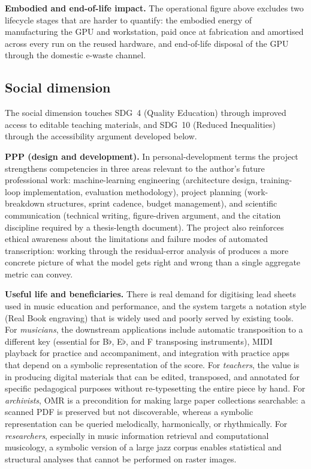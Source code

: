 \textbf{Embodied and end-of-life impact.}
The operational figure above excludes two lifecycle stages that are
harder to quantify: the embodied energy of manufacturing the GPU and
workstation, paid once at fabrication and amortised across every run
on the reused hardware, and end-of-life disposal of the GPU through
the domestic e-waste channel.

\subsection{Social dimension}
\label{sec:sust-social}
The social dimension touches SDG~4 (Quality Education) through
improved access to editable teaching materials, and SDG~10
(Reduced Inequalities) through the accessibility argument developed
below.

\textbf{PPP (design and development).}
In personal-development terms the project strengthens competencies
in three areas relevant to the author's future professional work:
machine-learning engineering (architecture design, training-loop
implementation, evaluation methodology), project planning
(work-breakdown structures, sprint cadence, budget management), and
scientific communication (technical writing, figure-driven argument,
and the citation discipline required by a thesis-length document).
The project also reinforces ethical awareness about the limitations
and failure modes of automated transcription: working through the
residual-error analysis of  produces a more
concrete picture of what the model gets right and wrong than a
single aggregate metric can convey.

\textbf{Useful life and beneficiaries.}
There is real demand for digitising lead sheets used in music
education and performance, and the system targets a notation style
(Real Book engraving) that is widely used and poorly served by
existing tools.
For \textit{musicians}, the downstream applications include
automatic transposition to a different key (essential for B$\flat$,
E$\flat$, and F transposing instruments), MIDI playback for
practice and accompaniment, and integration with practice apps that
depend on a symbolic representation of the score.
For \textit{teachers}, the value is in producing digital materials
that can be edited, transposed, and annotated for specific
pedagogical purposes without re-typesetting the entire piece by
hand.
For \textit{archivists}, OMR is a precondition for making large
paper collections searchable: a scanned PDF is preserved but not
discoverable, whereas a symbolic representation can be queried
melodically, harmonically, or rhythmically.
For \textit{researchers}, especially in music information retrieval
and computational musicology, a symbolic version of a large jazz
corpus enables statistical and structural analyses that cannot be
performed on raster images.

